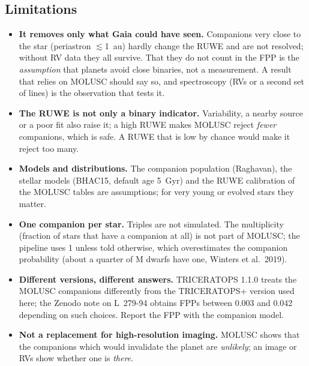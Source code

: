 \subsection*{Limitations}
\begin{itemize}
\item \textbf{It removes only what Gaia could have seen.} Companions very
close to the star (periastron $\lesssim$1~au) hardly change the RUWE and are
not resolved; without RV data they all survive. That they do not count in
the FPP is the \emph{assumption} that planets avoid close binaries, not a
measurement. A result that relies on MOLUSC should say so, and spectroscopy
(RVs or a second set of lines) is the observation that tests it.
\item \textbf{The RUWE is not only a binary indicator.} Variability, a
nearby source or a poor fit also raise it; a high RUWE makes MOLUSC reject
\emph{fewer} companions, which is safe. A RUWE that is low by chance would
make it reject too many.
\item \textbf{Models and distributions.} The companion population
(Raghavan), the stellar models (BHAC15, default age 5~Gyr) and the RUWE
calibration of the MOLUSC tables are assumptions; for very young or
evolved stars they matter.
\item \textbf{One companion per star.} Triples are not simulated. The
multiplicity (fraction of stars that have a companion at all) is not part
of MOLUSC; the pipeline uses 1 unless told otherwise, which overestimates
the companion probability (about a quarter of M dwarfs have one,
Winters et al.\ 2019).
\item \textbf{Different versions, different answers.} TRICERATOPS 1.1.0
treats the MOLUSC companions differently from the TRICERATOPS+ version
used here; the Zenodo note on L~279-94 obtains FPPs between 0.003 and 0.042
depending on such choices. Report the FPP with the companion model.
\item \textbf{Not a replacement for high-resolution imaging.} MOLUSC shows
that the companions which would invalidate the planet are \emph{unlikely};
an image or RVs show whether one is \emph{there}.
\end{itemize}
